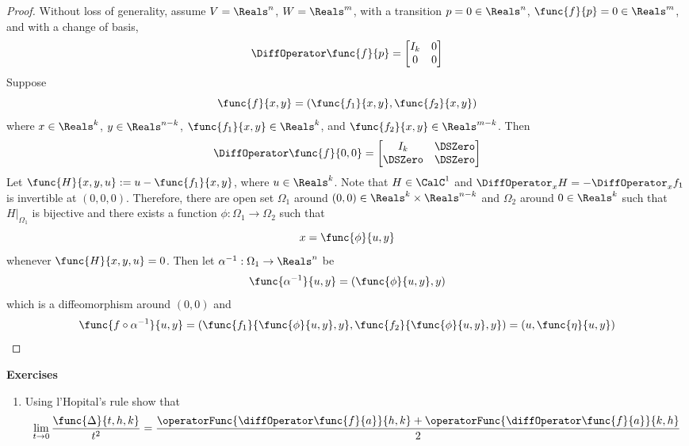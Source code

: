 \begin{proof}
    Without loss of generality, assume \(V = \Reals^n\), \(W = \Reals^m\), with a transition \(p = 0 \in \Reals^n\), \(\func{f}{p} = 0 \in \Reals^m\), and with a change of basis,
    \begin{equation*}
        \DiffOperator \func{f}{p} = \begin{bmatrix}
            I_k & 0 \\
            0   & 0 \\
        \end{bmatrix}
    \end{equation*}
    Suppose
    \begin{equation*}
        \func{f}{x,y} = (\func{f_1}{x,y}, \func{f_2}{x,y})
    \end{equation*}
    where \(x \in \Reals^k\), \(y \in \Reals^{n-k}\), \(\func{f_1}{x,y} \in \Reals^k\), and \(\func{f_2}{x,y} \in \Reals^{m-k}\). Then
    \begin{equation*}
        \DiffOperator \func{f}{0,0} = \begin{bmatrix}
            I_k     & \DSZero \\
            \DSZero & \DSZero
        \end{bmatrix}
    \end{equation*}
    Let \(\func{H}{x,y,u} := u - \func{f_1}{x,y}\), where \(u \in \Reals^k\). Note that \(H \in \CalC^1\) and \(\DiffOperator_x H = -\DiffOperator_x f_1\) is invertible at \((0,0,0)\). Therefore, there are open set \(\Omega_1\) around \((0,0) \in \Reals^{k} \times \Reals^{n-k}\) and \(\Omega_2\) around \(0 \in \Reals^k\) such that \(H|_{\Omega_1}\) is bijective and there exists a function \(\phi: \Omega_1 \to \Omega_2\) such that
    \begin{equation*}
        x = \func{\phi}{u,y}
    \end{equation*}
    whenever \(\func{H}{x,y,u} = 0\). Then let \(\alpha^{-1} : \Omega_1 \to \Reals^n\) be
    \begin{equation*}
        \func{\alpha^{-1}}{u,y} = (\func{\phi}{u,y},y)
    \end{equation*}
    which is a diffeomorphism around \((0,0)\) and
    \begin{equation*}
        \func{f \circ \alpha^{-1}}{u,y} = (\func{f_1}{\func{\phi}{u,y},y}, \func{f_2}{\func{\phi}{u,y},y}) = (u, \func{\eta}{u,y})
    \end{equation*}
\end{proof}

{\Large\textbf{Exercises}}
\begin{enumerate}
    \item Using l'Hopital's rule show that
          \begin{equation*}
              \lim_{t \to 0} \dfrac{\func{\Delta}{t,h,k}}{t^2} = \dfrac{\operatorFunc{\diffOperator \func{f}{a}}{h,k} + \operatorFunc{\diffOperator \func{f}{a}}{k,h}}{2}
          \end{equation*}
\end{enumerate}
\newpage
